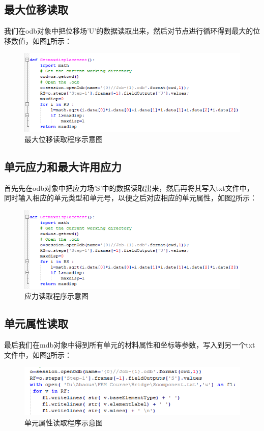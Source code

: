 \documentclass[forprint]{WHUBachelor}
\begin{document}
\subsection{最大位移读取}

我们在odb对象中把位移场’U’的数据读取出来，然后对节点进行循环得到最大的位移数值，如图\ref{4-4}所示：

\begin{figure}[H]
\centering  
\includegraphics[width = .8\textwidth]{4.png} 
\caption{最大位移读取程序示意图} 
\label{4-4} 
\end{figure}

\subsection{单元应力和最大许用应力}

首先先在odb对象中把应力场’S’中的数据读取出来，然后再将其写入txt文件中，同时输入相应的单元类型和单元号，以便之后对应相应的单元属性，如图\ref{4-5}所示：

\begin{figure}[H]
\centering  
\includegraphics[width = .8\textwidth]{4.png} 
\caption{应力读取程序示意图} 
\label{4-5} 
\end{figure}

\subsection{单元属性读取}

最后我们在mdb对象中得到所有单元的材料属性和坐标等参数，写入到另一个txt文件中，如图\ref{4-6}所示：

\begin{figure}[H]
\centering  
\includegraphics[width = .8\textwidth]{5.png} 
\caption{单元属性读取程序示意图} 
\label{4-6} 
\end{figure}
\end{document}
